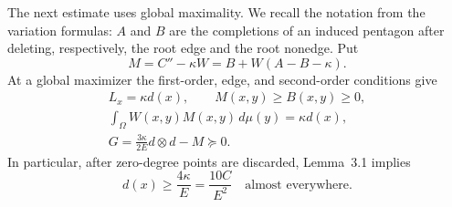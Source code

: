\documentclass[11pt]{amsart}
\theoremstyle{definition}
\theoremstyle{remark}
\begin{document}
The next estimate uses global maximality. We recall the notation from the
variation formulas: \(A\) and \(B\) are the completions of an induced
pentagon after deleting, respectively, the root edge and the root nonedge.
Put
\[
 M=C''-\kappa W=B+W(A-B-\kappa).
\]
At a global maximizer the first-order, edge, and second-order conditions
give
\begin{equation}
 \begin{gathered}
 L_x=\kappa d(x),\qquad M(x,y)\ge B(x,y)\ge0,\\
 \int_\Omega W(x,y)M(x,y)\,d\mu(y)=\kappa d(x),\\
 G=\frac{3\kappa}{2E}d\otimes d-M\succeq0.
 \end{gathered}\tag{14}
\end{equation}
In particular, after zero-degree points are discarded, Lemma~3.1 implies
\begin{equation}
 d(x)\ge\frac{4\kappa}{E}=\frac{10C}{E^2}
       \quad\text{almost everywhere}.\tag{15}
\end{equation}
\end{document}
